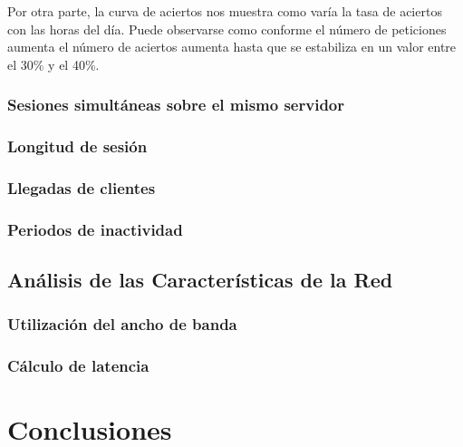 \documentclass[twocolumn,twoside]{Jornadas}
\begin{document}
Por otra parte, la curva de aciertos nos muestra como varía la tasa de aciertos con las horas del día. Puede observarse como conforme el número de peticiones aumenta el número de aciertos aumenta hasta que se estabiliza en un valor entre el 30\% y el 40\%.


\subsubsection{Sesiones simultáneas sobre el mismo servidor}
\label{simultaneas}

\subsubsection{Longitud de sesión}
\label{longitud}

\subsubsection{Llegadas de clientes}
\label{llegadas}

\subsubsection{Periodos de inactividad}
\label{periodos}

\subsection{Análisis de las Características de la Red}
\label{red}

\subsubsection{Utilización del ancho de banda}
\label{utilizacion}

\subsubsection{Cálculo de latencia}
\label{latencia}


\section{Conclusiones}
\label{conclusiones}



\nocite{*}

\end{document}
